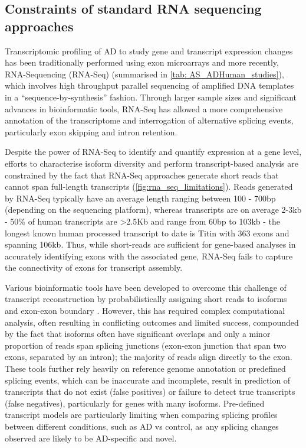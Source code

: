 \subsection{Constraints of standard RNA sequencing approaches}
\label{rnaseq_intro}
Transcriptomic profiling of AD to study gene and transcript expression changes has been traditionally performed using exon microarrays and more recently, RNA-Sequencing (RNA-Seq) (summarised in \cref{tab: AS_ADHuman_studies}), which involves high throughput parallel sequencing of amplified DNA templates in a “sequence-by-synthesis” fashion. Through larger sample sizes and significant advances in bioinformatic tools, RNA-Seq has allowed a more comprehensive annotation of the transcriptome and interrogation of alternative splicing events, particularly exon skipping and intron retention. 

Despite the power of RNA-Seq to identify and quantify expression at a gene level, efforts to characterise isoform diversity and perform transcript-based analysis are constrained by the fact that RNA-Seq approaches generate short reads that cannot span full-length transcripts (\cref{fig:rna_seq_limitations}). Reads generated by RNA-Seq typically have an average length ranging between 100 - 700bp (depending on the sequencing platform), whereas transcripts are on average 2-3kb - 50\% of human transcripts are >2.5Kb\cite{Sharon2013} and range from 60bp to 103kb \cite{Piovesan2016,Sharon2013} - the longest known human processed transcript to date is Titin with 363 exons and spanning 106kb\cite{Bang2001}. Thus, while short-reads are sufficient for gene-based analyses in accurately identifying exons with the associated gene, RNA-Seq fails to capture the connectivity of exons for transcript assembly\cite{Gordon2015}\cite{Wang2016}. 

Various bioinformatic tools have been developed to overcome this challenge of transcript reconstruction by probabilistically assigning short reads to isoforms and exon-exon boundary \cite{Trapnell2010, Kingsford2010, Au2013}. However, this has required complex computational analysis, often resulting in conflicting outcomes and limited success\cite{Steijger2013}, compounded by the fact that isoforms often have significant overlaps and only a minor proportion of reads span splicing junctions (exon-exon junction that span two exons, separated by an intron); the majority of reads align directly to the exon. These tools further rely heavily on reference genome annotation or predefined splicing events, which can be inaccurate and incomplete, result in prediction of transcripts that do not exist (false positives) or failure to detect true transcripts (false negatives), particularly for genes with many isoforms\cite{Au2013}. Pre-defined transcript models are particularly limiting when comparing splicing profiles between different conditions, such as AD vs control, as any splicing changes observed are likely to be AD-specific and novel. 


